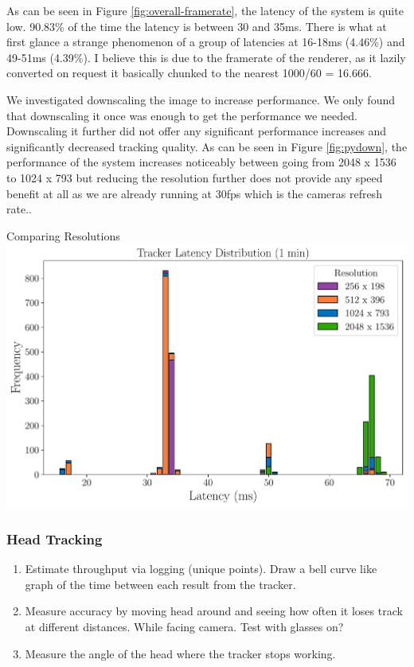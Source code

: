 As can be seen in Figure \ref{fig:overall-framerate}, the latency of the system is quite low. 90.83\% of the time the latency is between 30 and 35ms. There is what at first glance a strange phenomenon of a group of latencies at 16-18ms (4.46\%) and 49-51ms (4.39\%). I believe this is due to the framerate of the renderer, as it lazily converted on request it basically chunked to the nearest 1000/60 = 16.666.

We investigated downscaling the image to increase performance. We only found that downscaling it once was enough to get the performance we needed. Downscaling it further did not offer any significant performance increases and significantly decreased tracking quality. As can be seen in Figure \ref{fig:pydown}, the performance of the system increases noticeably between going from 2048 x 1536 to 1024 x 793 but reducing the resolution further does not provide any speed benefit at all as we are already running at 30fps which is the cameras refresh rate..

\begin{figureBox}[label={fig:pydown}, width=1.0\linewidth]{Comparing Resolutions}
	\includegraphics[width = 1.0\linewidth]{./evaluation/figures/pydown.pdf}
\end{figureBox}


\subsubsection{Head Tracking}
\begin{enumerate}
	\item Estimate throughput via logging (unique points). Draw a bell curve like graph of the time between each result from the tracker.
	\item Measure accuracy by moving head around and seeing how often it loses track at different distances. While facing camera. Test with glasses on?
	\item Measure the angle of the head where the tracker stops working.  
\end{enumerate}

